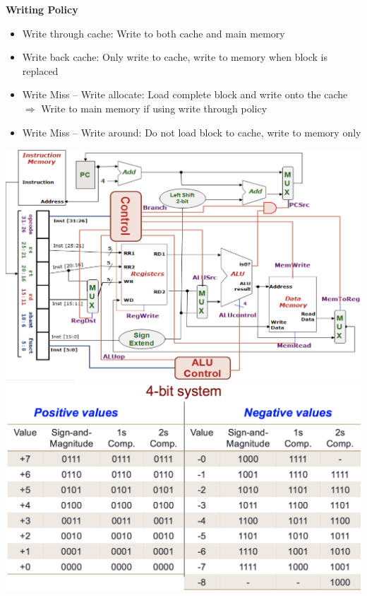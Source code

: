 \documentclass[a4paper]{article} \usepackage[backend=biber, style=numeric, sorting=none]{biblatex}
\begin{document}
\begin{multicols*}{4}
\textbf{{Writing Policy}}
\begin{itemize}[leftmargin=*]
\itemsep -0.5em
\item Write through cache: Write to both cache and main memory
\item Write back cache: Only write to cache, write to memory when block is replaced
\item Write Miss -- Write allocate: Load complete block and write onto the cache $\Rightarrow$ Write to main memory if using write through policy
\item Write Miss -- Write around: Do not load block to cache, write to memory only
\end{itemize}

\vfill\null
\columnbreak
\begin{center}
{\centering \includegraphics[angle=90,origin=c,scale=0.35]{dataPath}}
\vspace{5mm} %
\\ {\centering \includegraphics[angle=90,origin=c,scale=0.30]{fourBitRepresentation}}

\end{center}
\end{multicols*}
\end{document}
